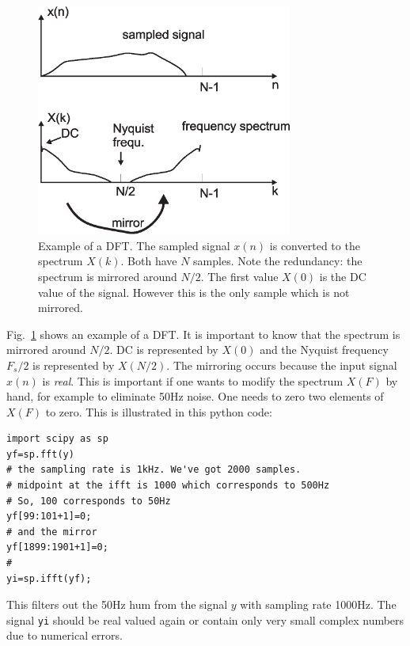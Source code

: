 \documentclass[12pt,a4paper]{article}
\begin{document}
\begin{figure}[!hbt]
\begin{center}
\mbox{\includegraphics[width=0.75\textwidth]{dft_example}}
\end{center}
\caption{Example of a DFT. The sampled signal $x(n)$ is
converted to the spectrum $X(k)$. Both have $N$ samples.
Note the redundancy: the spectrum is mirrored around $N/2$.
The first value $X(0)$ is the DC value of the signal. However
this is the only sample which is not mirrored.
\label{dft_example}}
\end{figure}
Fig.~\ref{dft_example} shows an example of a DFT. It is important
to know that the spectrum is mirrored around $N/2$. DC is represented
by $X(0)$ and the Nyquist frequency $F_s/2$ is represented by
$X(N/2)$. The mirroring occurs because the input signal $x(n)$
is \textsl{real}. This is important if one wants to modify the
spectrum $X(F)$ by hand, for example to eliminate 50Hz noise. One
needs to zero two elements of $X(F)$ to zero. This is illustrated
in this python code:
\begin{verbatim}
import scipy as sp
yf=sp.fft(y)
# the sampling rate is 1kHz. We've got 2000 samples.
# midpoint at the ifft is 1000 which corresponds to 500Hz
# So, 100 corresponds to 50Hz
yf[99:101+1]=0;
# and the mirror
yf[1899:1901+1]=0;
#
yi=sp.ifft(yf);
\end{verbatim}
This filters out the 50Hz hum from the signal $y$ with sampling rate
1000Hz. The signal \texttt{yi} should be real valued again or contain
only very small complex numbers due to numerical errors.
\end{document}

